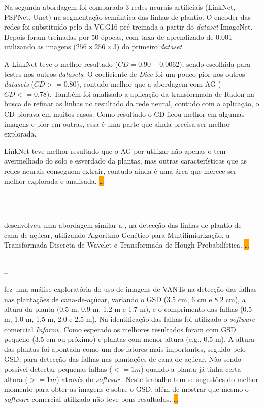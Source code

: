 \documentclass[12pt, a4paper, english, brazil]{article}
\newcommand{\textRed}[1]{{{\color{red} #1}}}
\newcommand{\dotsBlue}{\colorbox{orange}{\textcolor{blue}{\dots}}}
\newcommand{\linePage}{--------------------------------------------------------------------------------------------------------------}
\begin{document}
Na segunda abordagem foi comparado 3 redes neurais artificiais (LinkNet, PSPNet, Unet) na segmentação semântica das linhas de plantio.
O \textRed{encoder} das redes foi substituído pelo da VGG16 pré-treinada a partir do \textit{dataset} ImageNet. Depois foram treinadas por 50 épocas, com taxa de aprendizado de 0.001 utilizando as imagens ($256 \times 256 \times 3$) do primeiro \textit{dataset}.

A LinkNet teve o melhor resultado ($CD = 0.90 \pm 0.0062$), sendo escolhida para testes nos outros \textit{datasets}. O coeficiente de \textit{Dice} foi um pouco pior nos outros \textit{datasets} ($CD >= 0.80$), contudo melhor que a abordagem com AG ($CD <= 0.78$). Também foi analisado a aplicação da transformada de Radon na busca de refinar as linhas no resultado da rede neural, contudo com a aplicação, o CD piorava em muitos casos. Como resultado o CD ficou melhor em algumas imagens e pior em outras, essa é uma parte que ainda precisa ser melhor explorada.

LinkNet teve melhor resultado que o AG por utilizar não apenas o tem avermelhado do solo e esverdado da plantas, mas outras características que as redes neurais conseguem extrair, \textRed{contudo ainda é uma área que merece ser melhor explorada e analisada.} \dotsBlue

\linePage

 desenvolveu uma abordagem similar a , na detecção das linhas de plantio de cana-de-açúcar, utilizando Algoritmo Genético para Multilimiarização, a Transformada
Discreta de Wavelet e Transformada de Hough Probabilística.
\dotsBlue

\linePage

 fez uma análise exploratória do uso de imagens de VANTs na detecção das falhas nas plantações de cana-de-açúcar, variando o GSD (3.5 cm, 6 cm e 8.2 cm), a altura da planta (0.5 m, 0.9 m, 1.2 m e 1.7 m), e o comprimento das falhas (0.5 m, 1.0 m, 1.5 m, 2.0 e 2.5 m). Na identificação das falhas foi utilizado o \textit{software} comercial \textit{Inforow}. Como esperado os melhores resultados foram com GSD pequeno (3.5 cm ou próximo) e plantas com menor altura (e.g., 0.5 m). A altura das plantas foi apontada como um dos fatores mais importantes, seguido pelo GSD, para detecção das falhas nas plantações de cana-de-açúcar. Não sendo possível detectar pequenas falhas  ($<= 1 m$) quando a planta já tinha certa altura ($ >= 1m $) através do \textit{software}. Neste trabalho tem-se sugestões do melhor momento para obter as imagens e sobre o GSD, além de \textRed{mostrar} que mesmo o \textit{software} comercial utilizado não teve bons resultados. \dotsBlue
\end{document}
